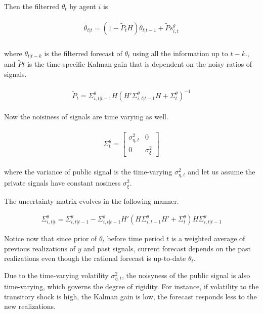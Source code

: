 \documentclass[]{article}
\begin{document}
Then the filterred $\theta_{t}$ by agent $i$ is 

\begin{eqnarray}
\begin{split}
\bar \theta_{t|t} =  (1-\tilde P_{t} H) \bar \theta_{t|t-1} + \tilde P s^\theta_{i,t} \\
\end{split}
\end{eqnarray}

where $\theta_{t|t-k}$ is the filterred forecast of $\theta_t$ using all the information up to $t-k$., and $\tilde Pt$ is the time-specific Kalman gain that is dependent on the noisy ratios of signals. 

\begin{eqnarray}
\begin{split}
\tilde P_{t} =  \Sigma^\theta_{i,t|t-1} H(H'\Sigma^\theta_{i,t|t-1} H + \Sigma^\theta_{t})^{-1} 
\end{split}
\end{eqnarray}

Now the noisiness of signals are time varying as well. 

\begin{eqnarray}
\begin{split}
\Sigma^\theta_t =  \left[ \begin{matrix} 
\sigma^2_{\eta,t} &  0 \\ 
0 & \sigma^2_\xi \end{matrix}\right] 
\end{split}               
\end{eqnarray}

where the variance of public signal is the time-varying $\sigma^2_{\eta,t}$ and let us assume the private signals have constant nosiness $\sigma^2_{\xi}$.

The uncertainty matrix evolves in the following manner. 

\begin{eqnarray}
\Sigma^\theta_{i,t|t} = \Sigma^\theta_{i,t|t-1} - \Sigma^\theta_{i,t|t-1} H'(H \Sigma^\theta_{i,t-1} H' +\Sigma^\theta_{t}) H \Sigma^\theta_{i,t|t-1} 
\end{eqnarray}

Notice now that since prior of $\theta_t$ before time period $t$ is a weighted average of previous realizations of $y$ and past signals, current forecast depends on the past realizations even though the rational forecast is up-to-date $\theta_t$. 

Due to the time-varying volatility $\sigma^2_{\eta,t}$, the noisyness of the public signal is also time-varying, which governs the degree of rigidity. For instance, if volatility to the transitory shock is high, the Kalman gain is low, the forecast responds less to the new realizations. 
\end{document}

